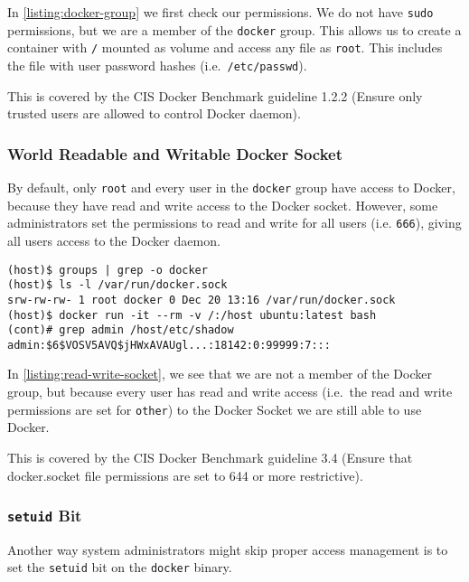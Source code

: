 In \autoref{listing:docker-group} we first check our permissions. We do not have \lstinline{sudo} permissions, but we are a member of the \lstinline{docker} group. This allows us to create a container with \lstinline{/} mounted as volume and access any file as \lstinline{root}. This includes the file with user password hashes (i.e.\ \lstinline{/etc/passwd}).

\medskip

This is covered by the CIS Docker Benchmark guideline 1.2.2 (Ensure only trusted users are allowed to control Docker daemon).

\subsubsection{World Readable and Writable Docker Socket}
By default, only \lstinline{root} and every user in the \lstinline{docker} group have access to Docker, because they have read and write access to the Docker socket. However, some administrators set the permissions to read and write for all users (i.e. \lstinline{666}), giving all users access to the Docker daemon.

\begin{lstlisting}[caption={All users can use Docker if they have read and write access to the Socket},captionpos=b,label={listing:read-write-socket}]
(host)$ groups | grep -o docker
(host)$ ls -l /var/run/docker.sock
srw-rw-rw- 1 root docker 0 Dec 20 13:16 /var/run/docker.sock
(host)$ docker run -it --rm -v /:/host ubuntu:latest bash
(cont)# grep admin /host/etc/shadow
admin:$6$VOSV5AVQ$jHWxAVAUgl...:18142:0:99999:7:::
\end{lstlisting}

In \autoref{listing:read-write-socket}, we see that we are not a member of the Docker group, but because every user has read and write access (i.e.\ the read and write permissions are set for \lstinline{other}) to the Docker Socket we are still able to use Docker.

\medskip

This is covered by the CIS Docker Benchmark guideline 3.4 (Ensure that docker.socket file permissions are set to 644 or more restrictive).

\subsubsection{\texorpdfstring{\lstinline{setuid}}{setuid} Bit}\label{subsubsection:setuid}
Another way system administrators might skip proper access management is to set the \lstinline{setuid} bit on the \lstinline{docker} binary.

